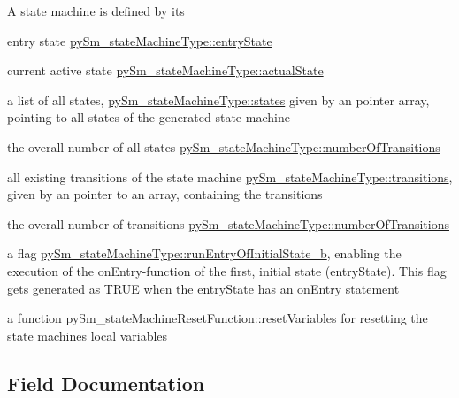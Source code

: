 A state machine is defined by it\textquotesingle{}s
\begin{DoxyItemize}
\item entry state \hyperlink{structpySm__stateMachineType_ac9896d220e5e80df257943742f47f6d0}{py\+Sm\+\_\+state\+Machine\+Type\+::entry\+State}
\item current active state \hyperlink{structpySm__stateMachineType_ae27c47a325a7b6d1caa4d67621e48fae}{py\+Sm\+\_\+state\+Machine\+Type\+::actual\+State}
\item a list of all states, \hyperlink{structpySm__stateMachineType_a6b964357abaeecf851825d1203a59582}{py\+Sm\+\_\+state\+Machine\+Type\+::states} given by an pointer array, pointing to all states of the generated state machine
\item the overall number of all states \hyperlink{structpySm__stateMachineType_a3d4035a87cce41845ae138aa2a279e20}{py\+Sm\+\_\+state\+Machine\+Type\+::number\+Of\+Transitions}
\item all existing transitions of the state machine \hyperlink{structpySm__stateMachineType_a3f35562e1b353b47e2a90a957882a610}{py\+Sm\+\_\+state\+Machine\+Type\+::transitions}, given by an pointer to an array, containing the transitions
\item the overall number of transitions \hyperlink{structpySm__stateMachineType_a3d4035a87cce41845ae138aa2a279e20}{py\+Sm\+\_\+state\+Machine\+Type\+::number\+Of\+Transitions}
\item a flag \hyperlink{structpySm__stateMachineType_a3320131411f6304cba856edbcfedd060}{py\+Sm\+\_\+state\+Machine\+Type\+::run\+Entry\+Of\+Initial\+State\+\_\+b}, enabling the execution of the on\+Entry-\/function of the first, initial state (entry\+State). This flag get\textquotesingle{}s generated as T\+R\+UE when the entry\+State has an on\+Entry statement
\item a function py\+Sm\+\_\+state\+Machine\+Reset\+Function\+::reset\+Variables for resetting the state machine\textquotesingle{}s local variables 
\end{DoxyItemize}

\subsection{Field Documentation}
\mbox{\label{structpySm__stateMachineType_ae27c47a325a7b6d1caa4d67621e48fae}} 
